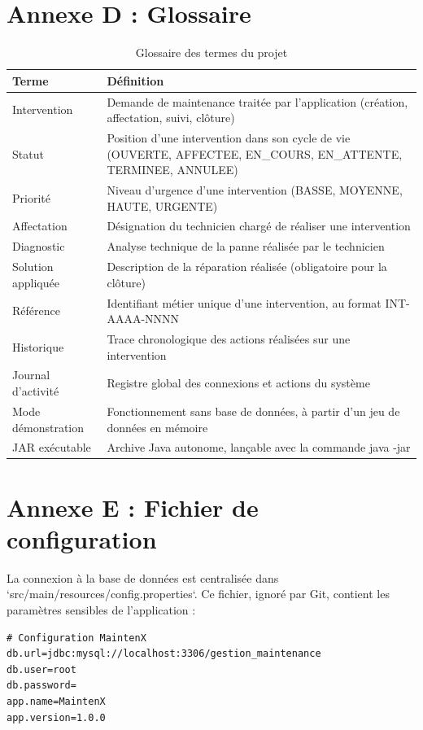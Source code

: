 \documentclass[11pt,a4paper]{report}
\begin{document}
\section*{Annexe D : Glossaire}
\begin{table}[htbp]\centering\small
\begin{tabularx}{\textwidth}{|p{3.8cm}|X|}
\hline\rowcolor{hdr}\textbf{Terme} & \textbf{Définition}\\ \hline
Intervention & Demande de maintenance traitée par l'application (création, affectation, suivi, clôture)\\ \hline
Statut & Position d'une intervention dans son cycle de vie (OUVERTE, AFFECTEE, EN\_COURS, EN\_ATTENTE, TERMINEE, ANNULEE)\\ \hline
Priorité & Niveau d'urgence d'une intervention (BASSE, MOYENNE, HAUTE, URGENTE)\\ \hline
Affectation & Désignation du technicien chargé de réaliser une intervention\\ \hline
Diagnostic & Analyse technique de la panne réalisée par le technicien\\ \hline
Solution appliquée & Description de la réparation réalisée (obligatoire pour la clôture)\\ \hline
Référence & Identifiant métier unique d'une intervention, au format INT-AAAA-NNNN\\ \hline
Historique & Trace chronologique des actions réalisées sur une intervention\\ \hline
Journal d'activité & Registre global des connexions et actions du système\\ \hline
Mode démonstration & Fonctionnement sans base de données, à partir d'un jeu de données en mémoire\\ \hline
JAR exécutable & Archive Java autonome, lançable avec la commande java -jar\\ \hline
\end{tabularx}
\caption{Glossaire des termes du projet}
\end{table}
\section*{Annexe E : Fichier de configuration}

La connexion à la base de données est centralisée dans `src/main/resources/config.properties`. Ce fichier, ignoré par Git, contient les paramètres sensibles de l'application :
\begin{lstlisting}
# Configuration MaintenX
db.url=jdbc:mysql://localhost:3306/gestion_maintenance
db.user=root
db.password=
app.name=MaintenX
app.version=1.0.0
\end{lstlisting}
\end{document}
